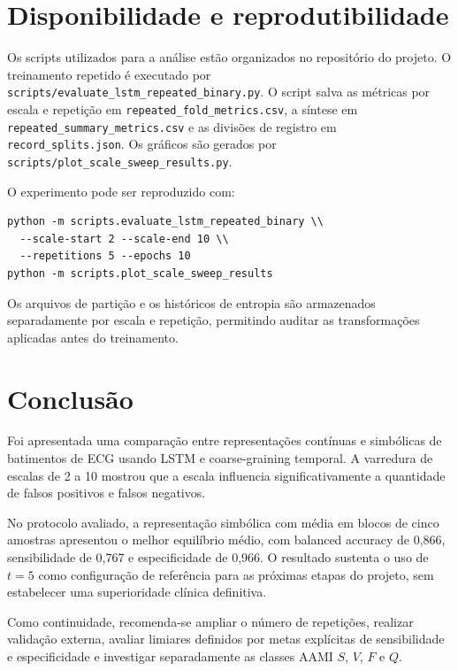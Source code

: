 \documentclass[12pt,a4paper]{article}
\begin{document}
\section{Disponibilidade e reprodutibilidade}

Os scripts utilizados para a análise estão organizados no repositório do projeto. O treinamento repetido é executado por \texttt{scripts/evaluate\_lstm\_repeated\_binary.py}. O script salva as métricas por escala e repetição em \texttt{repeated\_fold\_metrics.csv}, a síntese em \texttt{repeated\_summary\_metrics.csv} e as divisões de registro em \texttt{record\_splits.json}. Os gráficos são gerados por \texttt{scripts/plot\_scale\_sweep\_results.py}.

O experimento pode ser reproduzido com:

\begin{verbatim}
python -m scripts.evaluate_lstm_repeated_binary \\
  --scale-start 2 --scale-end 10 \\
  --repetitions 5 --epochs 10
python -m scripts.plot_scale_sweep_results
\end{verbatim}

Os arquivos de partição e os históricos de entropia são armazenados separadamente por escala e repetição, permitindo auditar as transformações aplicadas antes do treinamento.

\section{Conclusão}

Foi apresentada uma comparação entre representações contínuas e simbólicas de batimentos de ECG usando LSTM e coarse-graining temporal. A varredura de escalas de 2 a 10 mostrou que a escala influencia significativamente a quantidade de falsos positivos e falsos negativos.

No protocolo avaliado, a representação simbólica com média em blocos de cinco amostras apresentou o melhor equilíbrio médio, com balanced accuracy de 0,866, sensibilidade de 0,767 e especificidade de 0,966. O resultado sustenta o uso de $t=5$ como configuração de referência para as próximas etapas do projeto, sem estabelecer uma superioridade clínica definitiva.

Como continuidade, recomenda-se ampliar o número de repetições, realizar validação externa, avaliar limiares definidos por metas explícitas de sensibilidade e especificidade e investigar separadamente as classes AAMI $S$, $V$, $F$ e $Q$.
\end{document}
